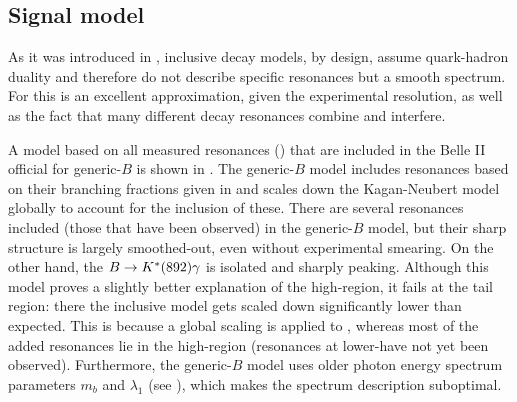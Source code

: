 \subsection{Signal model}\label{sec:signal_model}

As it was introduced in , inclusive decay models, by design, assume quark-hadron duality and therefore do not describe specific resonances but a smooth spectrum.
For \BtoXsgamma this is an excellent approximation, given the experimental resolution, as well as the fact that many different decay resonances combine and interfere.

A model based on all measured resonances () that are included in the Belle II official \MC for generic-$B$ is shown in .
The generic-$B$ model includes resonances based on their branching fractions given in  and scales down the Kagan-Neubert model globally to account for the inclusion of these.
There are several resonances included (those that have been observed) in the generic-$B$ model, but their sharp structure is largely smoothed-out, even without experimental smearing.
On the other hand, the $B\rightarrow K^*(892)\gamma$ is isolated and sharply peaking.
Although this model proves a slightly better explanation of the high-\EB region, it fails at the tail region: there the inclusive model gets scaled down significantly lower than expected.
This is because a global scaling is applied to \BtoXsgamma, whereas most of the added resonances lie in the high-\EB region (resonances at lower-\EB have not yet been observed).
Furthermore, the generic-$B$ model uses older \BtoXsgamma photon energy spectrum parameters $m_b$ and $\lambda_1$ (see ), which makes the spectrum description suboptimal.

